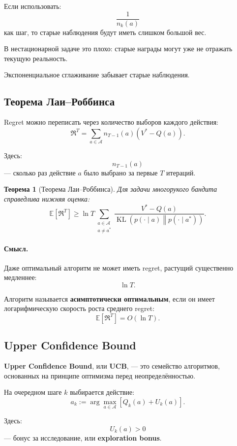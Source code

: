 \documentclass[12pt,a4paper]{article}
\newtheorem{theorem}{Теорема}
\begin{document}
Если использовать:
\[
\frac{1}{n_k(a)}
\]
как шаг, то старые наблюдения будут иметь слишком большой вес.

В нестационарной задаче это плохо: старые награды могут уже не отражать текущую реальность.

Экспоненциальное сглаживание забывает старые наблюдения.

\subsection{Теорема Лаи--Роббинса}

Regret можно переписать через количество выборов каждого действия:
\[
\mathfrak R^T
=
\sum_{a\in\mathcal A}
n_{T-1}(a)
\left(
V^\ast-Q(a)
\right).
\]

Здесь:
\[
n_{T-1}(a)
\]
--- сколько раз действие $a$ было выбрано за первые $T$ итераций.

\begin{theorem}[Теорема Лаи--Роббинса]
Для задачи многорукого бандита справедлива нижняя оценка:
\[
\mathbb E
\left[
\mathfrak R^T
\right]
\ge
\ln T
\sum_{\substack{a\in\mathcal A\\a\ne a^\ast}}
\frac{
V^\ast-Q(a)
}{
\operatorname{KL}
\left(
p(\cdot\mid a)
\middle\|
p(\cdot\mid a^\ast)
\right)
}.
\]
\end{theorem}

\paragraph{Смысл.}

Даже оптимальный алгоритм не может иметь regret, растущий существенно медленнее:
\[
\ln T.
\]

Алгоритм называется \textbf{асимптотически оптимальным}, если он имеет логарифмическую скорость роста среднего regret:
\[
\mathbb E
\left[
\mathfrak R^T
\right]
=
O(\ln T).
\]

\subsection{Upper Confidence Bound}

\textbf{Upper Confidence Bound}, или \textbf{UCB}, --- это семейство алгоритмов, основанных на принципе оптимизма перед неопределённостью.

На очередном шаге $k$ выбирается действие:
\[
a_k
:=
\arg\max_{a\in\mathcal A}
\left[
Q_k(a)+U_k(a)
\right].
\]

Здесь:
\[
U_k(a)>0
\]
--- бонус за исследование, или \textbf{exploration bonus}.
\end{document}
